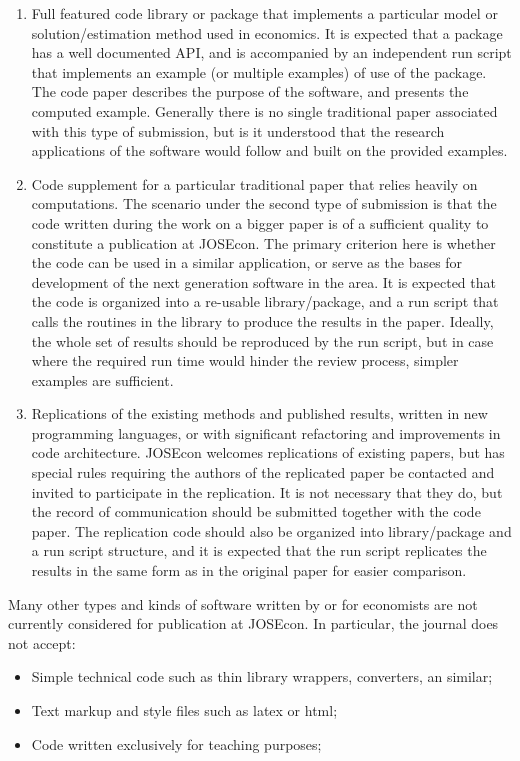 \begin{enumerate}

\item Full featured code library or package that implements a particular model or 
solution/estimation method used in economics.
It is expected that a package has a well documented API, and is accompanied by
an independent run script that implements an example (or multiple examples) of use
of the package.
The code paper describes the purpose of the software, and presents the computed 
example.
Generally there is no single traditional paper associated with this type of submission, 
but is it understood that the research applications of the software would follow and built
on the provided examples.

\item Code supplement for a particular traditional paper that relies heavily on computations.
The scenario under the second type of submission is that the code written during the work
on a bigger paper is of a sufficient quality to constitute a publication at JOSEcon.
The primary criterion here is whether the code can be used in a similar application, or
serve as the bases for development of the next generation software in the area.
It is expected that the code is organized into a re-usable library/package, and a run
script that calls the routines in the library to produce the results in the paper.
Ideally, the whole set of results should be reproduced by the run script, but 
in case where the required run time would hinder the review process, simpler examples
are sufficient.

\item Replications of the existing methods and published results, written in new
programming languages, or with significant refactoring and improvements in code architecture.
JOSEcon welcomes replications of existing papers, but has special rules requiring
the authors of the replicated paper be contacted and invited to participate in the 
replication.  It is not necessary that they do, but the record of communication should
be submitted together with the code paper.
The replication code should also be organized into library/package and a run script
structure, and it is expected that the run script replicates the results in the same
form as in the original paper for easier comparison.

\end{enumerate}

Many other types and kinds of software written by or for economists are not currently
considered for publication at JOSEcon. 
In particular, the journal does not accept:
\begin{itemize}
\item Simple technical code such as thin library wrappers,
converters, an similar;
\item Text markup and style files such as latex or html;
\item Code written exclusively for teaching purposes;
\end{itemize}


